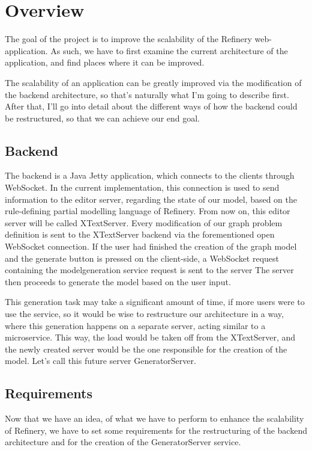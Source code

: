 \chapter{Overview}
The goal of the project is to improve the scalability of the Refinery web-application. As such, we have to first examine
the current architecture of the application, and find places where it can be improved.
 
The scalability of an application can be greatly improved via the modification of the backend architecture, so that's naturally what
I'm going to describe first. After that, I'll go into detail about the different ways of how the backend could be restructured,
 so that we can achieve our end goal. 


\section{Backend}

The backend is a Java Jetty application, which connects to the clients through WebSocket. In the current implementation,
this connection is used to send information to the editor server, regarding the state of our model, based on the 
rule-defining partial modelling language of Refinery.
From now on, this editor server will be called XTextServer. Every modification of our graph problem definition
is sent to the XTextServer backend via the forementioned open WebSocket connection. If the user had finished the creation of the graph model
and the generate button is pressed on the client-side, a WebSocket request containing the modelgeneration service request is sent to the server 
The server then proceeds to generate the model based on the user input.

This generation task may take a significant amount of time, if more users were to use the service, so it would
 be wise to restructure our architecture in a way, where this generation happens on a separate server,
 acting similar to a microservice. This way, the load would be taken off from 
the XTextServer, and the newly created server would be the one responsible for the creation of the model.
 Let's call this future server GeneratorServer.

\section{Requirements}
Now that we have an idea, of what we have to perform to enhance the scalability of Refinery, we have to set some requirements for the
restructuring of the backend architecture and for the creation of the GeneratorServer service. 


